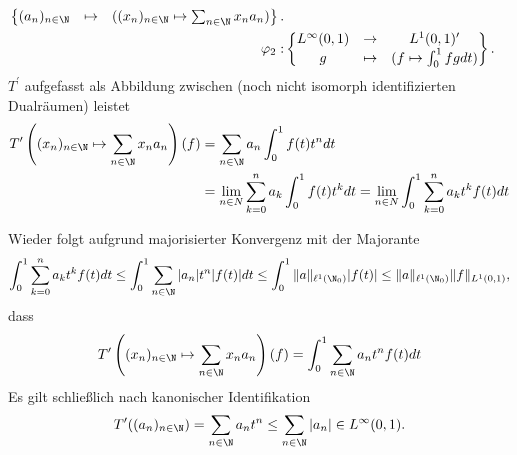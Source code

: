 \begin{solution}
\begin{align*}
\begin{Bmatrix}
    (a_n)_{n \in \N} &\mapsto & ((x_n)_{n \in \N} \mapsto \sum_{n \in \N}x_na_n)
  \end{Bmatrix}. \\
  \varphi_2:& \begin{Bmatrix}
    L^\infty(0, 1) & \to & L^1(0, 1)^{\prime} \\
    g &\mapsto & (f \mapsto \int_0^1 fg dt)
  \end{Bmatrix}.
\end{align*}
$T^{\prime}$ aufgefasst als Abbildung zwischen (noch nicht isomorph identifizierten
Dualräumen) leistet
\begin{align*}
  T^{\prime}\left((x_n)_{n \in \N} \mapsto \sum_{n \in \N}x_na_n\right)(f)
  &= \sum_{n \in \N}a_n\int_0^1 f(t)t^n dt \\
  &= \lim_{n \in N} \sum_{k= 0}^n a_k \int_0^1 f(t)t^k dt
  = \lim_{n \in N}  \int_0^1\sum_{k= 0}^n a_k t^k f(t) dt
\end{align*}

Wieder folgt aufgrund majorisierter Konvergenz mit der Majorante
\begin{align*}
  \int_0^1 \sum_{k=0}^n a_kt^k f(t)dt \leq \int_0^1 \sum_{n \in \N} |a_n|t^n|f(t)| dt
  \leq \int_0^1 \|a\|_{\ell^1(\N_0)}|f(t)| \leq \|a\|_{\ell^1(\N_0)}\|f\|_{L^1(0,1)},
\end{align*}
dass
\begin{align*}
  T^{\prime}\left((x_n)_{n \in \N} \mapsto \sum_{n \in \N}x_na_n\right)(f)
  = \int_0^1\sum_{n \in \N} a_n t^nf(t) dt
\end{align*}
Es gilt schließlich nach kanonischer Identifikation
\begin{align*}
  T^{\prime}((a_n)_{n \in\N}) = \sum_{n \in \N}a_n t^n \leq \sum_{n \in \N}|a_n| \in L^\infty(0, 1).
\end{align*}
\end{solution}
